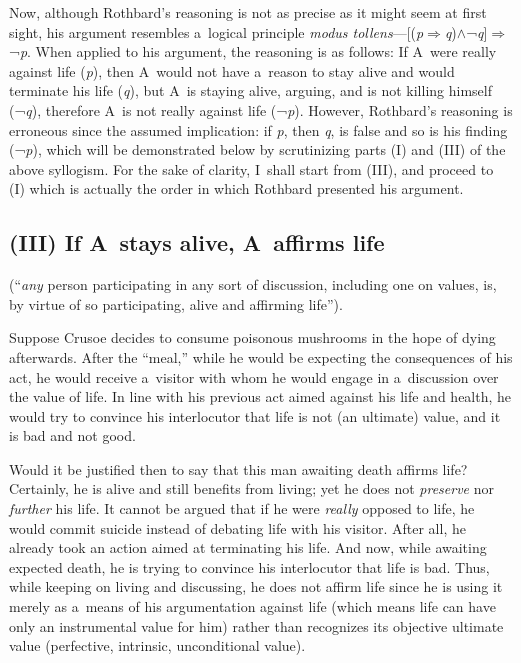Now, although Rothbard's reasoning is not as precise as it might seem at first sight, his argument resembles a~logical principle \textit{modus tollens}---[(\textit{p}$\Rightarrow $\textit{q})${\wedge}$¬\textit{q}]$\Rightarrow $¬\textit{p}. When applied to his argument, the reasoning is as follows: If A~were really against life (\textit{p}), then A~would not have a~reason to stay alive and would terminate his life (\textit{q}), but A~is staying alive, arguing, and is not killing himself (¬\textit{q}), therefore A~is not really against life (¬\textit{p}). However, Rothbard's reasoning is erroneous since the assumed implication: if \textit{p}, then \textit{q}, is false and so is his finding (¬\textit{p}), which will be demonstrated below by scrutinizing parts (I) and (III) of the above syllogism. For the sake of clarity, I~shall start from (III), and proceed to (I) which is actually the order in which Rothbard presented his argument.



\subsection{(III) If A~stays alive, A~affirms life }



(``\textit{any} person participating in any sort of discussion, including one on values, is, by virtue of so participating, alive and affirming life'').



Suppose Crusoe decides to consume poisonous mushrooms in the hope of dying afterwards. After the ``meal,'' while he would be expecting the consequences of his act, he would receive a~visitor with whom he would engage in a~discussion over the value of life. In line with his previous act aimed against his life and health, he would try to convince his interlocutor that life is not (an ultimate) value, and it is bad and not good.



Would it be justified then to say that this man awaiting death affirms life? Certainly, he is alive and still benefits from living; yet he does not \textit{preserve} nor \textit{further} his life. It cannot be argued that if he were \textit{really} opposed to life, he would commit suicide instead of debating life with his visitor. After all, he already took an action aimed at terminating his life. And now, while awaiting expected death, he is trying to convince his interlocutor that life is bad. Thus, while keeping on living and discussing, he does not affirm life since he is using it merely as a~means of his argumentation against life (which means life can have only an instrumental value for him) rather than recognizes its objective ultimate value (perfective, intrinsic, unconditional value).




